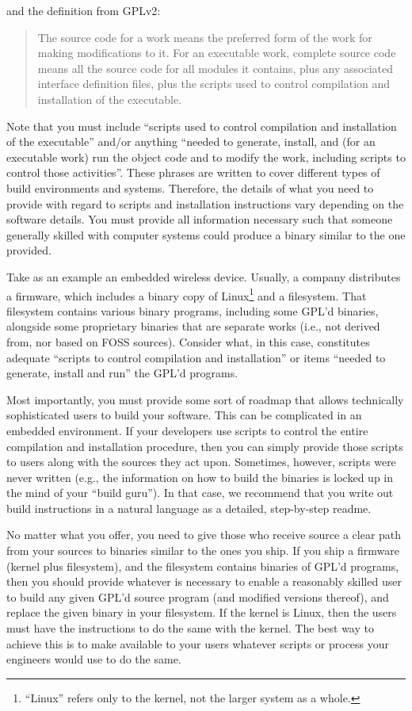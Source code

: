 \documentclass[letterpaper]{fixme}
\begin{document}
and the definition from GPLv2:
\begin{quote}
The source code for a work means the preferred form of the work for making
modifications to it.  For an executable work, complete source code means
all the source code for all modules it contains, plus any associated
interface definition files, plus the scripts used to control compilation
and installation of the executable.
\end{quote}

Note that you must include ``scripts used to control compilation and
installation of the executable'' and/or anything ``needed to generate,
install, and (for an executable work) run the object code and to modify
the work, including scripts to control those activities''.  These phrases
are written to cover different types of build environments and systems.
Therefore, the details of what you need to provide with regard to scripts
and installation instructions vary depending on the software details.  You
must provide all information necessary such that someone generally skilled
with computer systems could produce a binary similar to the one provided.

Take as an example an embedded wireless device.  Usually, a company
distributes a firmware, which includes a binary copy of
Linux\footnote{``Linux'' refers only to the kernel, not the larger system
  as a whole.} and a filesystem.  That filesystem contains various binary
programs, including some GPL'd binaries, alongside some proprietary
binaries that are separate works (i.e., not derived from, nor based on
FOSS sources).  Consider what, in this case, constitutes adequate
``scripts to control compilation and installation'' or items ``needed to
generate, install and run'' the GPL'd programs.

Most importantly, you must provide some sort of roadmap that allows
technically sophisticated users to build your software.  This can be
complicated in an embedded environment.  If your developers use scripts to
control the entire compilation and installation procedure, then you can
simply provide those scripts to users along with the sources they act
upon.  Sometimes, however, scripts were never written (e.g., the
information on how to build the binaries is locked up in the mind of your
``build guru'').  In that case, we recommend that you write out build
instructions in a natural language as a detailed, step-by-step {\sc
  readme}.

No matter what you offer, you need to give those who receive source a
clear path from your sources to binaries similar to the ones you ship.  If
you ship a firmware (kernel plus filesystem), and the filesystem contains
binaries of GPL'd programs, then you should provide whatever is necessary
to enable a reasonably skilled user to build any given GPL'd source
program (and modified versions thereof), and replace the given binary in
your filesystem.  If the kernel is Linux, then the users must have the
instructions to do the same with the kernel.  The best way to achieve this
is to make available to your users whatever scripts or process your
engineers would use to do the same.
\end{document}
